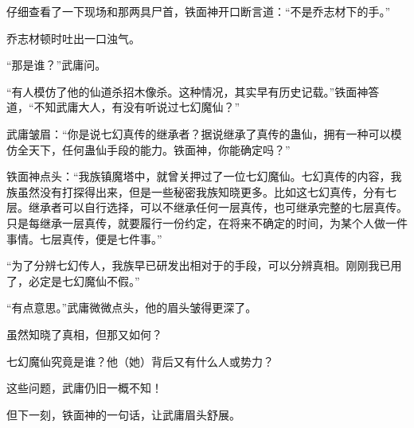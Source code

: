 \begin{this_body}
仔细查看了一下现场和那两具尸首，铁面神开口断言道：“不是乔志材下的手。”

乔志材顿时吐出一口浊气。

“那是谁？”武庸问。

“有人模仿了他的仙道杀招木像杀。这种情况，其实早有历史记载。”铁面神答道，“不知武庸大人，有没有听说过七幻魔仙？”

武庸皱眉：“你是说七幻真传的继承者？据说继承了真传的蛊仙，拥有一种可以模仿全天下，任何蛊仙手段的能力。铁面神，你能确定吗？”

铁面神点头：“我族镇魔塔中，就曾关押过了一位七幻魔仙。七幻真传的内容，我族虽然没有打探得出来，但是一些秘密我族知晓更多。比如这七幻真传，分有七层。继承者可以自行选择，可以不继承任何一层真传，也可继承完整的七层真传。只是每继承一层真传，就要履行一份约定，在将来不确定的时间，为某个人做一件事情。七层真传，便是七件事。”

“为了分辨七幻传人，我族早已研发出相对于的手段，可以分辨真相。刚刚我已用了，必定是七幻魔仙不假。”

“有点意思。”武庸微微点头，他的眉头皱得更深了。

虽然知晓了真相，但那又如何？

七幻魔仙究竟是谁？他（她）背后又有什么人或势力？

这些问题，武庸仍旧一概不知！

但下一刻，铁面神的一句话，让武庸眉头舒展。

\end{this_body}

